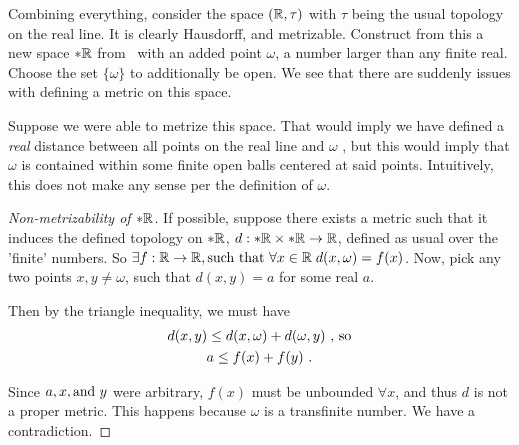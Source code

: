 \begin{frame}

    Combining everything, consider the space \((\mathbb{R}, \tau)\) with \(\tau\)
    being the usual topology on the real line. It is clearly Hausdorff, and
    metrizable. \pause Construct from this a new space \(*\mathbb{R}\) from \reals\,
    with an added point \(\omega\), a number larger than any finite real. Choose
    the set \(\{\omega\}\) to additionally be open. \pause We see that there are
    suddenly issues with defining a metric on this space.

\end{frame}

\begin{frame}

    Suppose we were able to metrize this space. That would imply we have defined
    a \emph{real} distance between all points on the real line and \(\omega\)
    \pause, but this would imply that \(\omega\) is contained within some finite
    open balls centered at said points. Intuitively, this does not make any
    sense per the definition of \(\omega\).

\end{frame}

\begin{frame}

    \begin{proof}[Non-metrizability of \(*\mathbb{R}\)]
        If possible, suppose there exists a metric such that it induces the
        defined topology on \(*\mathbb{R}\), \(d:*\mathbb{R} \times *\mathbb{R} \to
        \mathbb{R}\), defined as usual over the 'finite' numbers. \pause So
        \(\exists f:\mathbb{R} \to \mathbb{R}, \text{such that }\forall x \in \mathbb{R}
        \;d(x, \omega) = f(x)\). Now, pick any two points \(x, y \not =
        \omega\), such that \(d(x, y) = a\) for some real \(a\). 
        
        \pause 
        Then by the triangle inequality, we must have
        \begin{gather*}
            d(x, y) \leq d(x, \omega) + d(\omega, y) \textnormal{ , so} \\
            a \leq f(x) + f(y)~.
        \end{gather*}

        Since \(a, x, \textnormal{and } y\) were arbitrary, \(f(x)\) must be
        unbounded \(\forall x\), and thus \(d\) is not a proper metric. This
        happens because \(\omega\) is a transfinite number. We have a
        contradiction. 
    \end{proof}

\end{frame}